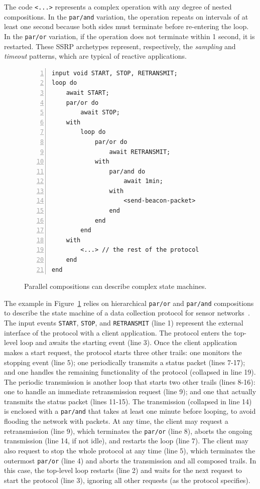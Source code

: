 \documentclass{sigplanconf}
\newcommand{\code}[1] {{\small{\texttt{#1}}}}
\newcommand{\1}{\;}
\newcommand{\2}{\;\;}
\newcommand{\3}{\;\;\;}
\newcommand{\5}{\;\;\;\;\;}
\begin{document}
The code \code{<...>} represents a complex operation with any degree of nested 
compositions.
%
In the \code{par/and} variation, the operation repeats on intervals of at least 
one second because both sides must terminate before re-entering the loop.
In the \code{par/or} variation, if the operation does not terminate within 1 
second, it is restarted.
%
These SSRP archetypes represent, respectively, the \emph{sampling} and 
\emph{timeout} patterns, which are typical of reactive applications.


\begin{figure}%
\begin{lstlisting}[numbers=left,xleftmargin=3em]
input void START, STOP, RETRANSMIT;
loop do
    await START;
    par/or do
        await STOP;
    with
        loop do
            par/or do
                await RETRANSMIT;
            with
                par/and do
                    await 1min;
                with
                    <send-beacon-packet>
                end
            end
        end
    with
        <...> // the rest of the protocol
    end
end
\end{lstlisting}
\caption{ Parallel compositions can describe complex state machines.
\label{lst.ctp}
}
\end{figure}

The example in Figure~\ref{lst.ctp} relies on hierarchical \code{par/or} and 
\code{par/and} compositions to describe the state machine of a data collection 
protocol for sensor networks~\cite{wsn.ctp,ceu.sensys13}.
%
The input events \code{START}, \code{STOP}, and \code{RETRANSMIT} (line 1) 
represent the external interface of the protocol with a client application.
%
The protocol enters the top-level loop and awaits the starting event (line 3).
Once the client application makes a start request, the protocol starts three 
other trails:
one monitors the stopping event (line 5);
one periodically transmits a status packet (lines 7-17);
and one handles the remaining functionality of the protocol (collapsed in line 
19).
%
The periodic transmission is another loop that starts two other trails (lines 
8-16):
one to handle an immediate retransmission request (line 9);
and one that actually transmits the status packet (lines 11-15).
%
The transmission (collapsed in line 14) is enclosed with a \code{par/and} that 
takes at least one minute before looping, to avoid flooding the network with 
packets.
%
At any time, the client may request a retransmission (line 9), which terminates 
the \code{par/or} (line 8), aborts the ongoing transmission (line 14, if not 
idle), and restarts the loop (line 7).
%
The client may also request to stop the whole protocol at any time (line 5), 
which terminates the outermost \code{par/or} (line 4) and aborts the 
transmission and all composed trails.
In this case, the top-level loop restarts (line 2) and waits for the next 
request to start the protocol (line 3), ignoring all other requests (as the 
protocol specifies).
\end{document}
